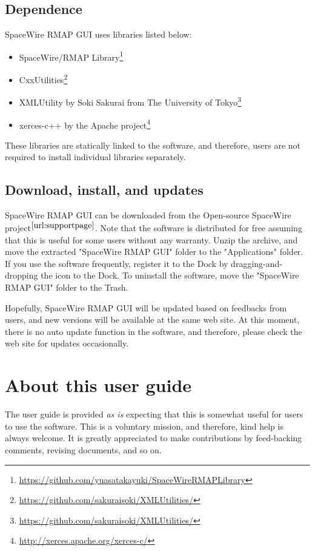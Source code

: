 \documentclass[a4paper,10pt]{article}
\begin{document}
\subsection{Dependence}
SpaceWire RMAP GUI uses libraries listed below:
\begin{itemize}
  \setlength{\parskip}{0cm}
  \setlength{\itemsep}{0cm}
\item SpaceWire/RMAP Library\footnote{\url{https://github.com/yuasatakayuki/SpaceWireRMAPLibrary}}
\item CxxUtilities\footnote{\url{https://github.com/sakuraisoki/XMLUtilities/}}
\item XMLUtility by Soki Sakurai from The University of Tokyo\footnote{\url{https://github.com/sakuraisoki/XMLUtilities/}}
\item xerces-c++ by the Apache project\footnote{\url{http://xerces.apache.org/xerces-c/}}
\end{itemize}
These libraries are statically linked to the software, and therefore, users are not required to install individual libraries separately.

\subsection{Download, install, and updates}
SpaceWire RMAP GUI can be downloaded from the Open-source SpaceWire project$^\mathrm{\ref{url:supportpage}}$.
Note that the software is distributed for free assuming that this is useful for some users without any warranty.
Unzip the archive, and move the extracted "SpaceWire RMAP GUI" folder to the "Applications" folder.
If you use the software frequently, register it to the Dock by dragging-and-dropping the icon to the Dock. To uninstall the software, move the "SpaceWire RMAP GUI" folder to the Trash.

Hopefully, SpaceWire RMAP GUI will be updated based on feedbacks from users, and new versions will be available at the same web site. At this moment, there is no auto update function in the software, and therefore, please check the web site for updates occasionally.


\section{About this user guide}
The user guide is provided {\it as is} expecting that this is somewhat useful for users to use the software. This is a voluntary mission, and therefore, kind help is always welcome. It is greatly appreciated to make contributions by feed-backing comments, revising documents, and so on.
\end{document}
